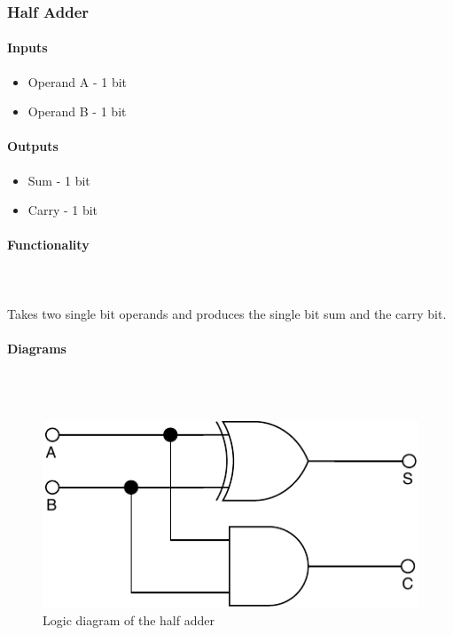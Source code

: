 \documentclass{article}
\begin{document}

    \subsubsection{Half Adder}

    \paragraph{Inputs}
    \begin{itemize}
        \item Operand A - 1 bit
        \item Operand B - 1 bit
    \end{itemize}

    \paragraph{Outputs}
    \begin{itemize}
        \item Sum - 1 bit
        \item Carry - 1 bit
    \end{itemize}

    \paragraph{Functionality}
    \hfill\\\\
    Takes two single bit operands and produces the single bit sum and the
    carry bit.

    \paragraph{Diagrams}
    \hfill\\\\
    \begin{figure}[H]
        \centering
        \includegraphics{../diagrams/alu/adder/half_adder.pdf}
        \caption{Logic diagram of the half adder}
    \end{figure}
\end{document}
